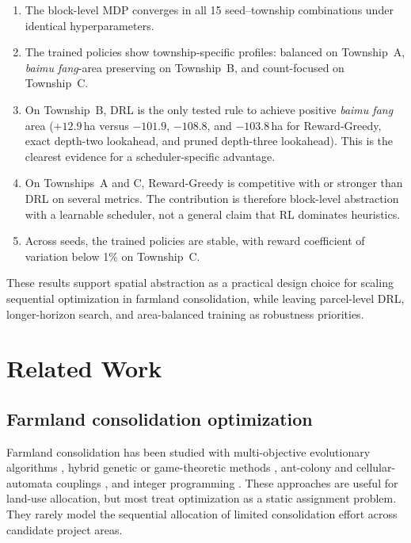 \documentclass[preprint,12pt]{elsarticle}
\begin{document}
\begin{enumerate}
\item The block-level MDP converges in all 15 seed--township combinations under identical hyperparameters.

\item The trained policies show township-specific profiles: balanced on Township~A, \textit{baimu fang}-area preserving on Township~B, and count-focused on Township~C.

\item On Township~B, DRL is the only tested rule to achieve positive \textit{baimu fang} area ($+12.9$\,ha versus $-101.9$, $-108.8$, and $-103.8$\,ha for Reward-Greedy, exact depth-two lookahead, and pruned depth-three lookahead). This is the clearest evidence for a scheduler-specific advantage.

\item On Townships~A and C, Reward-Greedy is competitive with or stronger than DRL on several metrics. The contribution is therefore block-level abstraction with a learnable scheduler, not a general claim that RL dominates heuristics.

\item Across seeds, the trained policies are stable, with reward coefficient of variation below 1\% on Township~C.
\end{enumerate}

These results support spatial abstraction as a practical design choice for scaling sequential optimization in farmland consolidation, while leaving parcel-level DRL, longer-horizon search, and area-balanced training as robustness priorities.


\section{Related Work}
\label{sec:related}

\subsection{Farmland consolidation optimization}

Farmland consolidation has been studied with multi-objective evolutionary algorithms \citep{deb2002fast,cao2011sustainable,cao2012spatial}, hybrid genetic or game-theoretic methods \citep{liu2012multi}, ant-colony and cellular-automata couplings \citep{li2011coupling}, and integer programming \citep{aerts2003using}. These approaches are useful for land-use allocation, but most treat optimization as a static assignment problem. They rarely model the sequential allocation of limited consolidation effort across candidate project areas.
\end{document}
